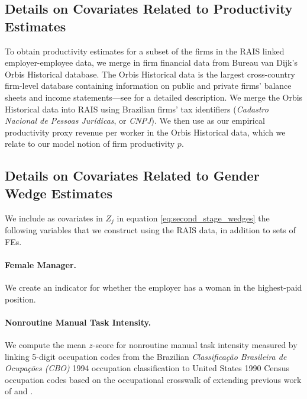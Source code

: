 \subsection{Details on Covariates Related to Productivity Estimates\label{app:estimation_productivity_data}}

To obtain productivity estimates for a subset of the firms in the RAIS linked employer-employee data, we merge in firm financial data from Bureau van Dijk's Orbis Historical database. The Orbis Historical data is the largest cross-country firm-level database containing information on public and private firms' balance sheets and income statements---see \citet{Kalemli-OzcanSorensenVillegas-SanchezVolosovychYesiltas2024} for a detailed description. We merge the Orbis Historical data into RAIS using Brazilian firms' tax identifiers (\emph{Cadastro Nacional de Pessoas Jurídicas}, or \emph{CNPJ}). We then use as our empirical productivity proxy revenue per worker in the Orbis Historical data, which we relate to our model notion of firm productivity $p$.


\subsection{Details on Covariates Related to Gender Wedge Estimates\label{app:estimation_wedge_covariates}}

We include as covariates in $Z_{j}$ in equation \eqref{eq:second_stage_wedges} the following {\NWedgeCovariates} variables that we construct using the RAIS data, in addition to {\NDummies} sets of FEs.


\paragraph{Female Manager.}

We create an indicator for whether the employer has a woman in the highest-paid position.


\paragraph{Nonroutine Manual Task Intensity.}

We compute the mean $z$-score for nonroutine manual task intensity measured by linking 5-digit occupation codes from the Brazilian \emph{Classifica{\c{c}}{\~{a}}o Brasileira de Ocupa{\c{c}}{\~{o}}es (CBO)} 1994 occupation classification to United States 1990 Census occupation codes based on the occupational crosswalk of \citet{deSouza2024} extending previous work of \citet{AutorDorn2009} and \citet{AcemogluAutor2011}.



